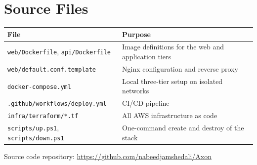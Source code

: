 \documentclass[10pt,a4paper]{article}
\newcommand{\hdr}{\rowcolor{rowblue}}
\begin{document}
\section{Source Files}
\begin{table}[H]
\centering\small
\begin{tabular}{@{}p{5.6cm} p{8.1cm}@{}}
\toprule
\hdr File & Purpose\\
\midrule
\texttt{web/Dockerfile}, \texttt{api/Dockerfile} & Image definitions for the web and application tiers\\
\texttt{web/default.conf.template} & Nginx configuration and reverse proxy\\
\texttt{docker-compose.yml} & Local three-tier setup on isolated networks\\
\texttt{.github/workflows/deploy.yml} & CI/CD pipeline\\
\texttt{infra/terraform/*.tf} & All AWS infrastructure as code\\
\texttt{scripts/up.ps1}, \texttt{scripts/down.ps1} & One-command create and destroy of the stack\\
\bottomrule
\end{tabular}
\end{table}
\noindent Source code repository: \url{https://github.com/nabeedjamshedali/Axon}
\end{document}

